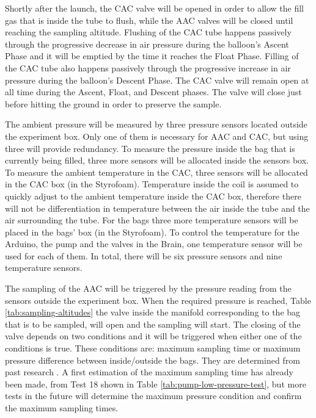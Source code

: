 \documentclass[a4paper,12pt,twoside]{article}
\begin{document}
Shortly after the launch, the CAC valve will be opened in order to allow the fill gas that is inside the tube to flush, while the AAC valves will be closed until reaching the sampling altitude. Flushing of the CAC tube happens passively through the progressive decrease in air pressure during the balloon's Ascent Phase and it will be emptied by the time it reaches the Float Phase. Filling of the CAC tube also happens passively through the progressive increase in air pressure during the balloon's Descent Phase. The CAC valve will remain open at all time during the Ascent, Float, and Descent phases. The valve will close just before hitting the ground in order to preserve the sample. 

The ambient pressure will be measured by three pressure sensors located outside the experiment box. Only one of them is necessary for AAC and CAC, but using three will provide redundancy. To measure the pressure inside the bag that is currently being filled, three more sensors will be allocated inside the sensors box. To measure the ambient temperature in the CAC, three sensors will be allocated in the CAC box (in the Styrofoam). Temperature inside the coil is assumed to quickly adjust to the ambient temperature inside the CAC box, therefore there will not be differentiation in temperature between the air inside the tube and the air surrounding the tube. For the bags three more temperature sensors will be placed in the bags' box (in the Styrofoam). To control the temperature for the Arduino, the pump and the valves in the Brain, one temperature sensor will be used for each of them. In total, there will be six pressure sensors and nine temperature sensors. 

The sampling of the AAC will be triggered by the pressure reading from the sensors outside the experiment box. When the required pressure is reached, Table \ref{tab:sampling-altitudes} the valve inside the manifold corresponding to the bag that is to be sampled, will open and the sampling will start. The closing of the valve depends on two conditions and it will be triggered when either one of the conditions is true. These conditions are: maximum sampling time or maximum pressure difference between inside/outside the bags. They are determined from past research \cite{LISA}. A first estimation of the maximum sampling time has already been made, from Test 18 shown in Table \ref{tab:pump-low-pressure-test}, but more tests in the future will determine the maximum pressure condition and confirm the maximum sampling times.
\end{document}
